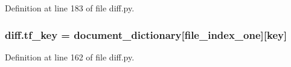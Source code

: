 Definition at line 183 of file diff.\+py.

\subsubsection[{\texorpdfstring{tf\+\_\+key}{tf_key}}]{\setlength{\rightskip}{0pt plus 5cm}diff.\+tf\+\_\+key = {\bf document\+\_\+dictionary}\mbox{[}{\bf file\+\_\+index\+\_\+one}\mbox{]}\mbox{[}key\mbox{]}}\hypertarget{namespacediff_ab860e167471d632882c770f12e87927e}{}\label{namespacediff_ab860e167471d632882c770f12e87927e}


Definition at line 162 of file diff.\+py.

